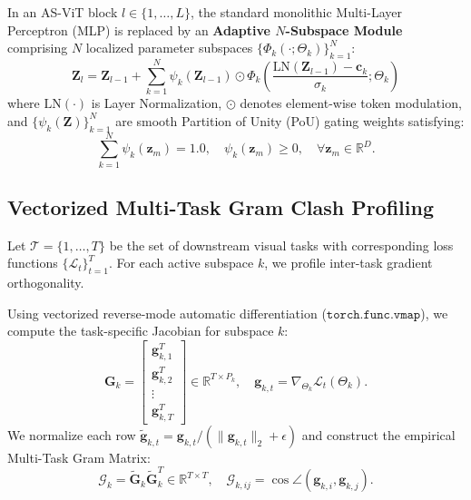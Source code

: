 \documentclass[10pt,journal,compsoc]{IEEEtran}
\begin{document}
In an AS-ViT block $l \in \{1, \dots, L\}$, the standard monolithic Multi-Layer Perceptron (MLP) is replaced by an \textbf{Adaptive $N$-Subspace Module} comprising $N$ localized parameter subspaces $\{\Phi_k(\cdot; \Theta_k)\}_{k=1}^N$:
\begin{equation}
\label{eq:as_vit_forward}
\mathbf{Z}_{l} = \mathbf{Z}_{l-1} + \sum_{k=1}^N \psi_k(\mathbf{Z}_{l-1}) \odot \Phi_k\left(\frac{\text{LN}(\mathbf{Z}_{l-1}) - \mathbf{c}_k}{\sigma_k}; \Theta_k\right)
\end{equation}
where $\text{LN}(\cdot)$ is Layer Normalization, $\odot$ denotes element-wise token modulation, and $\{\psi_k(\mathbf{Z})\}_{k=1}^N$ are smooth Partition of Unity (PoU) gating weights satisfying:
\begin{equation}
\sum_{k=1}^N \psi_k(\mathbf{z}_m) = 1.0, \quad \psi_k(\mathbf{z}_m) \ge 0, \quad \forall \mathbf{z}_m \in \mathbb{R}^D.
\end{equation}

\subsection{Vectorized Multi-Task Gram Clash Profiling}
Let $\mathcal{T} = \{1, \dots, T\}$ be the set of downstream visual tasks with corresponding loss functions $\{\mathcal{L}_t\}_{t=1}^T$. For each active subspace $k$, we profile inter-task gradient orthogonality.

Using vectorized reverse-mode automatic differentiation ($\texttt{torch.func.vmap}$), we compute the task-specific Jacobian for subspace $k$:
\begin{equation}
\mathbf{G}_k = \begin{bmatrix} \mathbf{g}_{k, 1}^T \\ \mathbf{g}_{k, 2}^T \\ \vdots \\ \mathbf{g}_{k, T}^T \end{bmatrix} \in \mathbb{R}^{T \times P_k}, \quad \mathbf{g}_{k, t} = \nabla_{\Theta_k} \mathcal{L}_t(\Theta_k).
\end{equation}
We normalize each row $\tilde{\mathbf{g}}_{k, t} = \mathbf{g}_{k, t} / (\|\mathbf{g}_{k, t}\|_2 + \epsilon)$ and construct the empirical Multi-Task Gram Matrix:
\begin{equation}
\mathcal{G}_k = \tilde{\mathbf{G}}_k \tilde{\mathbf{G}}_k^T \in \mathbb{R}^{T \times T}, \quad \mathcal{G}_{k, ij} = \cos \angle (\mathbf{g}_{k, i}, \mathbf{g}_{k, j}).
\end{equation}
\end{document}

